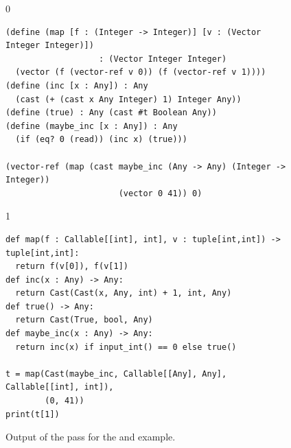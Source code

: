 \documentclass[7x10]{TimesAPriori_MIT}%
\def\racketEd{0}
\def\pythonEd{1}
\providecommand{\BookEdition}{1}
\let\edition\BookEdition
\newcommand{\pythonColor}[0]{}
\numberwithin{theorem}{chapter}
\numberwithin{definition}{chapter}
\numberwithin{equation}{chapter}
\begin{document}
\begin{figure}[btp]
  \begin{tcolorbox}[colback=white]
{\if\edition\racketEd        
\begin{lstlisting}
(define (map [f : (Integer -> Integer)] [v : (Vector Integer Integer)])
                   : (Vector Integer Integer)
  (vector (f (vector-ref v 0)) (f (vector-ref v 1))))
(define (inc [x : Any]) : Any
  (cast (+ (cast x Any Integer) 1) Integer Any))
(define (true) : Any (cast #t Boolean Any))
(define (maybe_inc [x : Any]) : Any
  (if (eq? 0 (read)) (inc x) (true)))

(vector-ref (map (cast maybe_inc (Any -> Any) (Integer -> Integer))
                       (vector 0 41)) 0)
\end{lstlisting}
\fi}
{\if\edition\pythonEd\pythonColor        
\begin{lstlisting}[basicstyle=\ttfamily\footnotesize]
def map(f : Callable[[int], int], v : tuple[int,int]) -> tuple[int,int]:
  return f(v[0]), f(v[1])
def inc(x : Any) -> Any:
  return Cast(Cast(x, Any, int) + 1, int, Any)
def true() -> Any:
  return Cast(True, bool, Any)
def maybe_inc(x : Any) -> Any:
  return inc(x) if input_int() == 0 else true()

t = map(Cast(maybe_inc, Callable[[Any], Any], Callable[[int], int]),
        (0, 41))
print(t[1])
\end{lstlisting}
\fi}
\vspace{-5pt}
\end{tcolorbox}

\caption{Output of the  pass for the 
  and  example.}
\label{fig:map-cast}
\end{figure}
\end{document}

